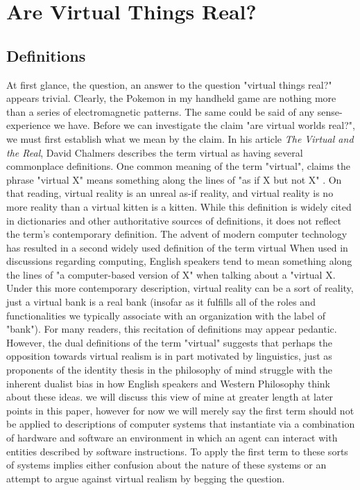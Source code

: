 \chapter{Are Virtual Things Real?}
\section{Definitions}
At first glance, the question, an answer to the question "virtual things real?" appears trivial. Clearly, the Pokemon in my handheld game are nothing more than a series of electromagnetic patterns. The same could be said of any sense-experience we have. 
Before we can investigate the claim "are virtual worlds real?", we must first establish what we mean by the claim. In his article \textit{The Virtual and the Real}, David Chalmers describes the term virtual as having several commonplace definitions. One common meaning of the term "virtual", claims the phrase "virtual X" means something along the lines of "as if X but not X" . On that reading, virtual reality is an unreal as-if reality, and virtual reality is no more reality than a virtual kitten is a kitten. \cite{ChalmersVR} While this definition is widely cited in dictionaries and other authoritative sources of definitions, it does not reflect the term's contemporary definition. The advent of modern computer technology has resulted in a second widely used definition of the term virtual When used in discussions regarding computing, English speakers  tend to mean something along the lines of "a computer-based version of X" when talking about a "virtual X. Under this more contemporary description, virtual reality can be a sort of reality, just a virtual bank is a real bank (insofar as it fulfills all of the roles and functionalities we typically associate with an organization with the label of "bank"). 
For many readers, this recitation of definitions may appear pedantic. However, the dual definitions of the term "virtual" suggests that perhaps the opposition towards virtual realism is in part motivated by linguistics, just as proponents of the identity thesis in the philosophy of mind struggle with the inherent dualist bias in how English speakers and Western Philosophy think about these ideas. we will discuss this view of mine at greater length at later points in this paper, however for now we will merely say the first term should not be applied to descriptions of computer systems that instantiate via a combination of hardware and software an environment in which an agent can interact with entities described by software instructions. To apply the first term to these sorts of systems implies either confusion about the nature of these systems or an attempt to argue against virtual realism by begging the question. 
